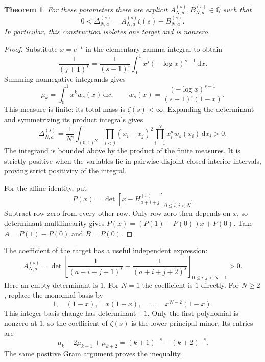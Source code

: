 \documentclass[11pt]{article}
\newtheorem{theorem}{Theorem}
\newcommand{\dd}{\,\mathrm{d}}
\newcommand{\HH}[2]{H_{#1}^{(#2)}}
\newcommand{\Q}{\mathbb Q}
\begin{document}
\begin{theorem}
For these parameters there are explicit $A_{N,a}^{(s)},B_{N,a}^{(s)}\in\Q$
such that
\begin{equation}
 0<\Delta_{N,a}^{(s)}
   =A_{N,a}^{(s)}\zeta(s)+B_{N,a}^{(s)}.
 \label{eq:affine}
\end{equation}
In particular, this construction isolates one target and is nonzero.
\end{theorem}
\begin{proof}
Substitute $x=e^{-t}$ in the elementary gamma integral to obtain
\[
 \frac1{(j+1)^s}
 =\frac1{(s-1)!}\int_0^1 x^j(-\log x)^{s-1}\dd x .
\]
Summing nonnegative integrands gives
\begin{equation}
 \mu_k=\int_0^1 x^k w_s(x)\dd x,\qquad
 w_s(x)=\frac{(-\log x)^{s-1}}{(s-1)!(1-x)} .
 \label{eq:weight}
\end{equation}
This measure is finite: its total mass is $\zeta(s)<\infty$.
Expanding the determinant and symmetrizing its product integrals gives
\begin{equation}
 \Delta_{N,a}^{(s)}
 =\frac1{N!}\int_{(0,1)^N}
  \prod_{i<j}(x_i-x_j)^2
  \prod_{i=1}^N x_i^a w_s(x_i)\dd x_i>0 .
 \label{eq:gram}
\end{equation}
The integrand is bounded above by the product of the finite measures.
It is strictly positive when the variables lie in pairwise disjoint
closed interior intervals, proving strict positivity of the integral.

For the affine identity, put
\[
 P(x)=\det[x-\HH{a+i+j}{s}]_{0\le i,j<N}.
\]
Subtract row zero from every other row. Only row zero then depends on $x$,
so determinant multilinearity gives
$P(x)=(P(1)-P(0))x+P(0)$. Take $A=P(1)-P(0)$ and $B=P(0)$.
\end{proof}

The coefficient of the target has a useful independent expression:
\begin{equation}
 A_{N,a}^{(s)}
 =\det\left[
 \frac1{(a+i+j+1)^s}-\frac1{(a+i+j+2)^s}
 \right]_{0\le i,j<N-1}>0 .
 \label{eq:coefficient}
\end{equation}
Here an empty determinant is $1$. For $N=1$ the coefficient is $1$ directly.
For $N\ge2$, replace the monomial basis by
\[
 1,\quad(1-x),\quad x(1-x),\quad\ldots,\quad x^{N-2}(1-x).
\]
This integer basis change has determinant
$\pm1$. Only the first polynomial is nonzero at $1$, so the coefficient of
$\zeta(s)$ is the lower principal minor. Its entries are
\[
 \mu_k-2\mu_{k+1}+\mu_{k+2}=(k+1)^{-s}-(k+2)^{-s}.
\]
The same positive Gram argument proves the inequality.
\end{document}
